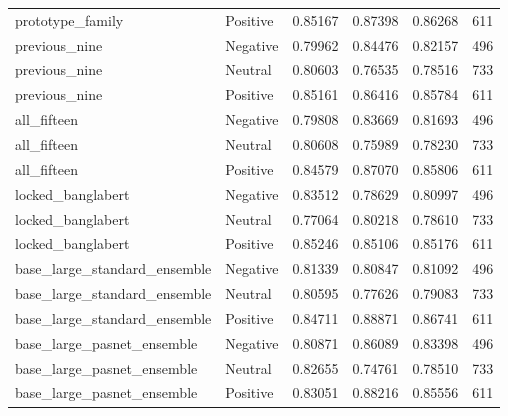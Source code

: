 \begin{tabular}{llrrrr}
prototype\_family & Positive & 0.85167 & 0.87398 & 0.86268 & 611 \\
previous\_nine & Negative & 0.79962 & 0.84476 & 0.82157 & 496 \\
previous\_nine & Neutral & 0.80603 & 0.76535 & 0.78516 & 733 \\
previous\_nine & Positive & 0.85161 & 0.86416 & 0.85784 & 611 \\
all\_fifteen & Negative & 0.79808 & 0.83669 & 0.81693 & 496 \\
all\_fifteen & Neutral & 0.80608 & 0.75989 & 0.78230 & 733 \\
all\_fifteen & Positive & 0.84579 & 0.87070 & 0.85806 & 611 \\
locked\_banglabert & Negative & 0.83512 & 0.78629 & 0.80997 & 496 \\
locked\_banglabert & Neutral & 0.77064 & 0.80218 & 0.78610 & 733 \\
locked\_banglabert & Positive & 0.85246 & 0.85106 & 0.85176 & 611 \\
base\_large\_standard\_ensemble & Negative & 0.81339 & 0.80847 & 0.81092 & 496 \\
base\_large\_standard\_ensemble & Neutral & 0.80595 & 0.77626 & 0.79083 & 733 \\
base\_large\_standard\_ensemble & Positive & 0.84711 & 0.88871 & 0.86741 & 611 \\
base\_large\_pasnet\_ensemble & Negative & 0.80871 & 0.86089 & 0.83398 & 496 \\
base\_large\_pasnet\_ensemble & Neutral & 0.82655 & 0.74761 & 0.78510 & 733 \\
base\_large\_pasnet\_ensemble & Positive & 0.83051 & 0.88216 & 0.85556 & 611 \\
\bottomrule
\end{tabular}
